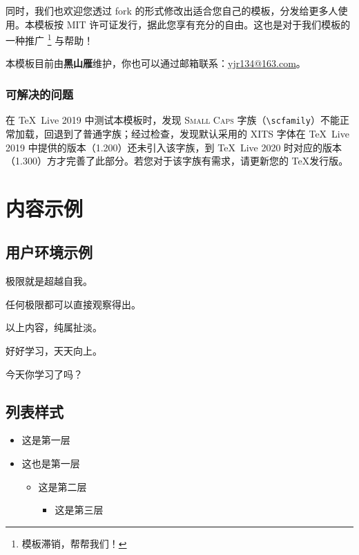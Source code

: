 \documentclass[
  10pt,
  twoside,
  openany,
  b5paper, %
  colorscheme = basic %
]{qyxf-book}
\begin{document}
同时，我们也欢迎您透过 fork 的形式修改出适合您自己的模板，分发给更多人使用。本模板按 MIT 许可证发行，据此您享有充分的自由。这也是对于我们模板的一种推广
\footnote{模板滞销，帮帮我们！}
与帮助！

本模板目前由\textbf{黑山雁}维护，你也可以通过邮箱联系：\url{yjr134@163.com}。

\subsection{可解决的问题}

在 \TeX\ Live 2019 中测试本模板时，发现 \textsc{Small Caps} 字族（\verb|\scfamily|）不能正常加载，回退到了普通字族；经过检查，发现默认采用的 XITS 字体在 \TeX\ Live 2019 中提供的版本（1.200）还未引入该字族，到 \TeX\ Live 2020 时对应的版本（1.300）方才完善了此部分。若您对于该字族有需求，请更新您的 \TeX 发行版。

\chapter{内容示例}
\section{用户环境示例}

\begin{define}
  极限就是超越自我。
\end{define}

\begin{theorem}
  任何极限都可以直接观察得出。
\end{theorem}

\begin{lemma}
  以上内容，纯属扯淡。
\end{lemma}

\begin{note}
  好好学习，天天向上。
\end{note}

\begin{alert}
  今天你学习了吗？
\end{alert}

\section{列表样式}
\begin{itemize}
  \item 这是第一层
  \item 这也是第一层
  \begin{itemize}
    \item 这是第二层
    \begin{itemize}
      \item 这是第三层
    \end{itemize}
  \end{itemize}
\end{itemize}
\end{document}
